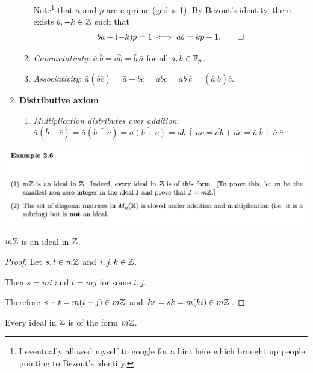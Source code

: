 \documentclass[12pt]{article}
\begin{document}
\begin{enumerate}
\begin{enumerate}
    Note\footnote{I eventually allowed myself to google for a hint here which
      brought up people pointing to Bezout's identity.} that $a$ and $p$ are
    coprime (gcd is 1). By Bezout's identity, there exists $b, -k \in \mathbb{Z}$
    such that
    \begin{align*}
      ba + (-k)p = 1 \iff ab = kp + 1. \qed
    \end{align*}


  \item \textit{Commutativity}:
    $\bar a ~ \bar b = \bar{ab} = \bar{b} ~ \bar{a}$ for all $a, b \in \mathbb{F}_p$.
  \item \textit{Associativity}:
    $\bar a (\bar b \bar c) = \bar a + \bar {bc} = \bar{abc} =
    \bar{ab}~\bar{c} = (\bar a ~ \bar b) \bar{c}$.
  \end{enumerate}
\item \textbf{Distributive axiom}
  \begin{enumerate}
  \item \textit{Multiplication distributes over addition}: $\bar a (\bar b + \bar c) = \bar a (\bar{b + c}) = \bar{a(b+c)} = \bar{ab +
    ac} = \bar{ab} + \bar{ac} = \bar{a}~\bar{b} + \bar{a}~\bar{c}$
  \end{enumerate}
\end{enumerate}

\newpage

\begin{mdframed}
\includegraphics[width=400pt]{img/linear-algebra-eg-2-6.png}
\end{mdframed}

\begin{claim*}
  $m\mathbb{Z}$ is an ideal in $\mathbb{Z}$.
\end{claim*}

\begin{proof}Let $s, t \in m\mathbb{Z}$ and $i, j, k \in \mathbb{Z}$.

  Then $s = mi$ and $t = mj$ for some $i, j$.

  Therefore $s - t = m(i - j) \in m\mathbb{Z}$ and $ks = sk = m(ki) \in m\mathbb{Z}$.
\end{proof}

\begin{claim*}
  Every ideal in $\mathbb{Z}$ is of the form $m\mathbb{Z}$.
\end{claim*}
\end{document}
